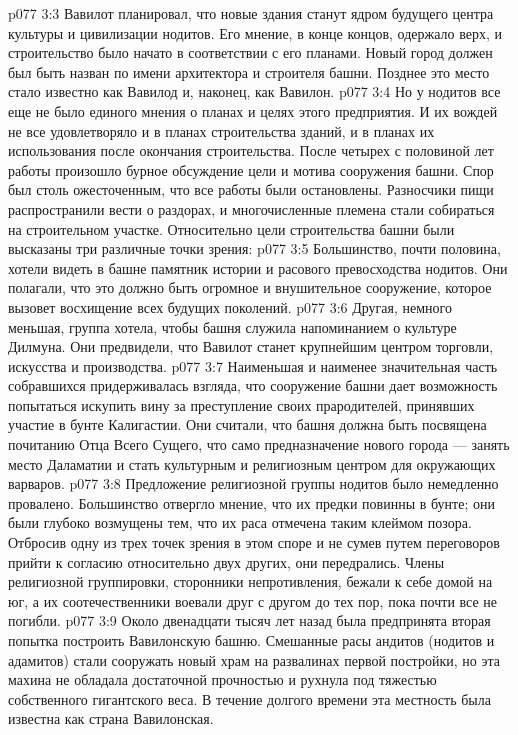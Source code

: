 \vs p077 3:3 Вавилот планировал, что новые здания станут ядром будущего центра культуры и цивилизации нодитов. Его мнение, в конце концов, одержало верх, и строительство было начато в соответствии с его планами. Новый город должен был быть назван  по имени архитектора и строителя башни. Позднее это место стало известно как Вавилод и, наконец, как Вавилон.
\vs p077 3:4 Но у нодитов все еще не было единого мнения о планах и целях этого предприятия. И их вождей не все удовлетворяло и в планах строительства зданий, и в планах их использования после окончания строительства. После четырех с половиной лет работы произошло бурное обсуждение цели и мотива сооружения башни. Спор был столь ожесточенным, что все работы были остановлены. Разносчики пищи распространили вести о раздорах, и многочисленные племена стали собираться на строительном участке. Относительно цели строительства башни были высказаны три различные точки зрения:
\vs p077 3:5 \bibnobreakspace Большинство, почти половина, хотели видеть в башне памятник истории и расового превосходства нодитов. Они полагали, что это должно быть огромное и внушительное сооружение, которое вызовет восхищение всех будущих поколений.
\vs p077 3:6 \pc {}\bibnobreakspace Другая, немного меньшая, группа хотела, чтобы башня служила напоминанием о культуре Дилмуна. Они предвидели, что Вавилот станет крупнейшим центром торговли, искусства и производства.
\vs p077 3:7 \pc {}\bibnobreakspace Наименьшая и наименее значительная часть собравшихся придерживалась взгляда, что сооружение башни дает возможность попытаться искупить вину за преступление своих прародителей, принявших участие в бунте Калигастии. Они считали, что башня должна быть посвящена почитанию Отца Всего Сущего, что само предназначение нового города --- занять место Даламатии и стать культурным и религиозным центром для окружающих варваров.
\vs p077 3:8 \pc Предложение религиозной группы нодитов было немедленно провалено. Большинство отвергло мнение, что их предки повинны в бунте; они были глубоко возмущены тем, что их раса отмечена таким клеймом позора. Отбросив одну из трех точек зрения в этом споре и не сумев путем переговоров прийти к согласию относительно двух других, они передрались. Члены религиозной группировки, сторонники непротивления, бежали к себе домой на юг, а их соотечественники воевали друг с другом до тех пор, пока почти все не погибли.
\vs p077 3:9 \pc Около двенадцати тысяч лет назад была предпринята вторая попытка построить Вавилонскую башню. Смешанные расы андитов (нодитов и адамитов) стали сооружать новый храм на развалинах первой постройки, но эта махина не обладала достаточной прочностью и рухнула под тяжестью собственного гигантского веса. В течение долгого времени эта местность была известна как страна Вавилонская.
